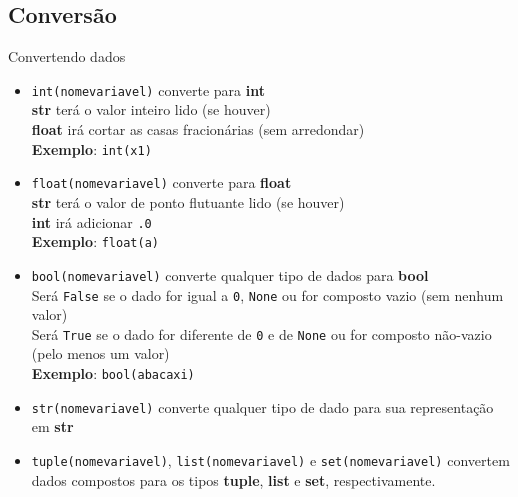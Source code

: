 %	
%
%

\subsection{Conversão}
\begin{frame}[allowframebreaks]{Convertendo dados}
	\begin{itemize}
		\item \texttt{int(nomevariavel)} converte para \textbf{int}
			\\ \textbf{str} terá o valor inteiro lido (se houver)
			\\ \textbf{float} irá cortar as casas fracionárias (sem arredondar)					
			\\ \textbf{Exemplo}:
			\texttt{int(x1)}			
		
		
		\item \texttt{float(nomevariavel)} converte para \textbf{float}
			\\ \textbf{str} terá o valor de ponto flutuante lido (se houver)
			\\ \textbf{int} irá adicionar \texttt{.0} 					
			\\ \textbf{Exemplo}:
			\texttt{float(a)}
		
		\quebra
		
		
		\item \texttt{bool(nomevariavel)} converte qualquer tipo de dados para \textbf{bool}
			\\ Será \texttt{False} se o dado for igual a \texttt{0}, \texttt{None} ou for composto vazio (sem nenhum valor)  					
			\\ Será \texttt{True} se o dado for diferente de \texttt{0} e de \texttt{None} ou for composto não-vazio (pelo menos um valor)
			\\ \textbf{Exemplo}:
			\texttt{bool(abacaxi)}
				
		\quebra
		
		\item \texttt{str(nomevariavel)} converte qualquer tipo de dado para sua representação em \textbf{str} 
		
		
		\item \texttt{tuple(nomevariavel)}, \texttt{list(nomevariavel)} e \texttt{set(nomevariavel)} convertem dados compostos para os tipos \textbf{tuple}, \textbf{list} e \textbf{set}, respectivamente.
	\end{itemize}
  \end{frame}	

